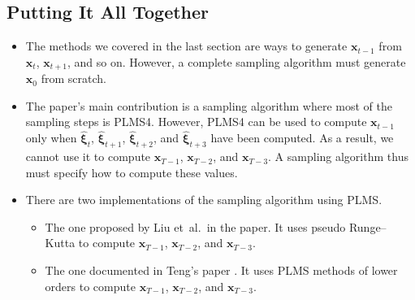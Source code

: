 \documentclass[10pt]{article}
\newcommand{\ve}[1]{\mathbf{#1}}
\newcommand{\ves}[1]{\boldsymbol{#1}}
\newcommand{\etal}{{et~al.}}
\begin{document}
\subsection{Putting It All Together}

\begin{itemize}
  \item The methods we covered in the last section are ways to generate $\ve{x}_{t-1}$ from $\ve{x}_t$, $\ve{x}_{t+1}$, and so on. However, a complete sampling algorithm must generate $\ve{x}_0$ from scratch.
  
  \item The paper's main contribution is a sampling algorithm where most of the sampling steps is PLMS4. However, PLMS4 can be used to compute $\ve{x}_{t-1}$ only when $\widehat{\ves{\xi}}_t$, $\widehat{\ves{\xi}}_{t+1}$, $\widehat{\ves{\xi}}_{t+2}$, and $\widehat{\ves{\xi}}_{t+3}$ have been computed. As a result, we cannot use it to compute $\ve{x}_{T-1}$, $\ve{x}_{T-2}$, and $\ve{x}_{T-3}$. A sampling algorithm thus must specify how to compute these values.
  
  \item There are two implementations of the sampling algorithm using PLMS.
  \begin{itemize}
    \item The one proposed by Liu \etal\ in the paper. It uses pseudo Runge--Kutta to compute $\ve{x}_{T-1}$, $\ve{x}_{T-2}$, and $\ve{x}_{T-3}$.
    \item The one documented in Teng's paper \cite{Wizadwongsa:2023}. It uses PLMS methods of lower orders to compute $\ve{x}_{T-1}$, $\ve{x}_{T-2}$, and $\ve{x}_{T-3}$.
  \end{itemize}


\end{itemize}
\end{document}
